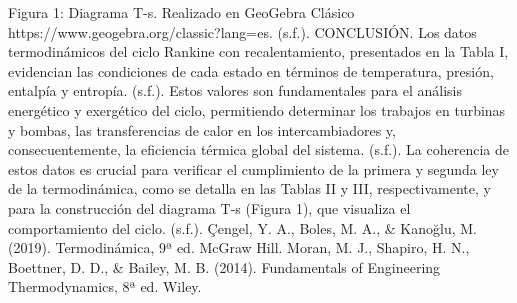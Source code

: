 \documentclass{beamer}
\begin{document}
\begin{frame}
\begin{thebibliography}{9}
         Figura 1: Diagrama T-s. Realizado en GeoGebra Clásico https://www.geogebra.org/classic?lang=es. (s.f.). 
         CONCLUSIÓN. Los datos termodinámicos del ciclo Rankine con recalentamiento, presentados en la Tabla I, evidencian las condiciones de cada estado en términos de temperatura, presión, entalpía y entropía. (s.f.). 
         Estos valores son fundamentales para el análisis energético y exergético del ciclo, permitiendo determinar los trabajos en turbinas y bombas, las transferencias de calor en los intercambiadores y, consecuentemente, la eficiencia térmica global del sistema. (s.f.). 
         La coherencia de estos datos es crucial para verificar el cumplimiento de la primera y segunda ley de la termodinámica, como se detalla en las Tablas II y III, respectivamente, y para la construcción del diagrama T-s (Figura 1), que visualiza el comportamiento del ciclo. (s.f.). 
         Çengel, Y. A., Boles, M. A., \& Kanoğlu, M. (2019). Termodinámica, 9ª ed. McGraw Hill. 
         Moran, M. J., Shapiro, H. N., Boettner, D. D., \& Bailey, M. B. (2014). Fundamentals of Engineering Thermodynamics, 8ª ed. Wiley. 
    \end{thebibliography}
\end{frame}
\end{document}
